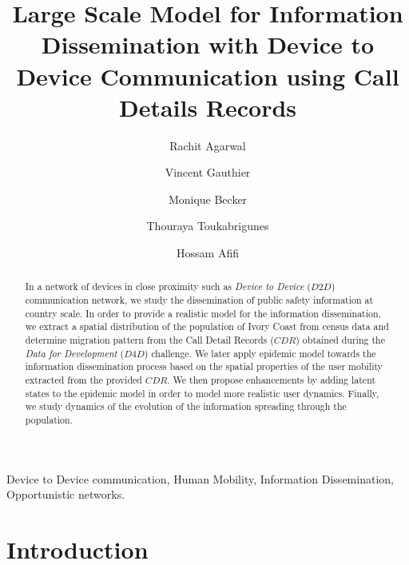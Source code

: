 \documentclass[review]{elsarticle}
\begin{document}
\begin{frontmatter}

\title{Large Scale Model for Information Dissemination with Device to Device Communication using Call Details Records}




\author[mainaddress]{Rachit Agarwal}
\author[mainaddress]{Vincent Gauthier }
\author[mainaddress]{Monique Becker}
\author[mainaddress,secondaryaddress]{Thouraya Toukabrigunes}
\author[mainaddress]{Hossam Afifi}
\address[mainaddress]{Lab. CNRS SAMOVAR UMR 5157, Telecom SudParis/Institut Mines-Telecom.}
\address[secondaryaddress]{Orange Lab.}

\begin{abstract}
In a network of devices in close proximity such as \emph{Device to Device} ($D2D$) communication network, we study the dissemination of public safety information at country scale. In order to provide a realistic model for the information dissemination, we extract a spatial distribution of the population of Ivory Coast from census data and determine migration pattern from the Call Detail Records ($CDR$) obtained during the \emph{Data for Development} ($D4D$) challenge. We later apply epidemic model towards the information dissemination process based on the spatial properties of the user mobility extracted from the provided $CDR$. We then propose enhancements by adding latent states to the epidemic model in order to model more realistic user dynamics. Finally, we study dynamics of the evolution of the information spreading through the population.
\end{abstract}

\begin{keyword}
Device to Device communication, Human Mobility, Information Dissemination, Opportunistic networks.
\end{keyword}

\end{frontmatter}
\section{Introduction}\label{sec:introduction}
\end{document}

